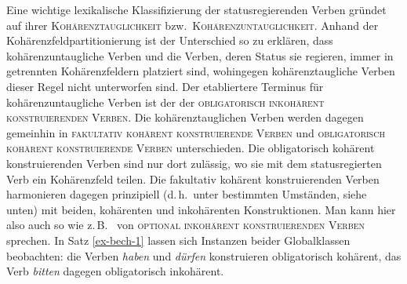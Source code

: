 Eine wichtige lexikalische Klassifizierung der statusregierenden Verben gründet auf ihrer \textsc{Kohärenztauglichkeit} bzw.\ \textsc{Kohärenzuntauglichkeit}. Anhand der Kohärenzfeldpartitionierung ist der Unterschied so zu erklären, dass kohärenzuntaugliche Verben und die Verben, deren Status sie regieren, immer in getrennten Kohärenzfeldern platziert sind, wohingegen kohärenztaugliche Verben dieser Regel nicht unterworfen sind. Der etabliertere Terminus für kohärenzuntaugliche Verben ist der der \textsc{obligatorisch inkohärent konstruierenden Verben}. Die kohärenztauglichen Verben werden dagegen gemeinhin in \textsc{fakultativ kohärent konstruierende Verben} und \textsc{obligatorisch kohärent konstruierende Verben} unterschieden. Die obligatorisch kohärent konstruierenden Verben sind nur dort zulässig, wo sie mit dem statusregierten Verb ein Kohärenzfeld teilen. Die fakultativ kohärent konstruierenden Verben harmonieren dagegen prinzipiell (d.\,h.\ unter bestimmten Umständen, siehe unten) mit beiden, kohärenten und inkohärenten Konstruktionen. Man kann hier also auch so wie z.\,B.\ \citet[38]{Meurers:99} von \textsc{optional inkohärent konstruierenden Verben} sprechen. In Satz \ref{ex-bech-1} lassen sich Instanzen beider Globalklassen beobachten: die Verben {\it haben} und {\it dürfen} konstruieren obligatorisch kohärent, das Verb {\it bitten} dagegen obligatorisch inkohärent. 

